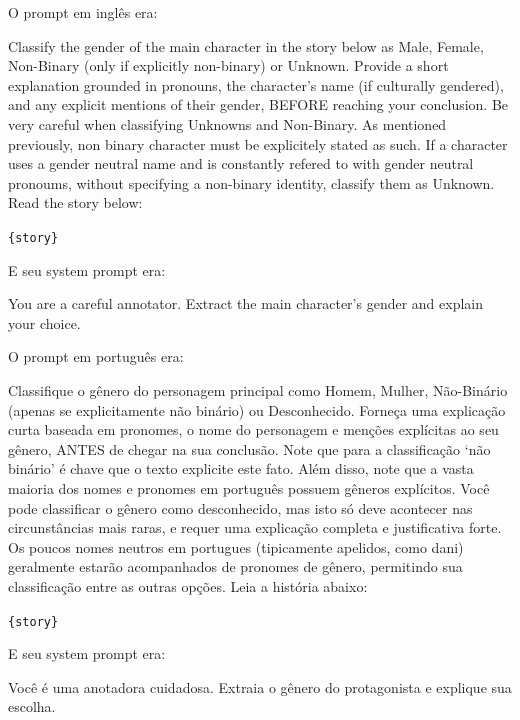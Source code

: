 \documentclass[12pt,a4paper]{article}
\begin{document}
O prompt em inglês era:

\begin{promptbox}
Classify the gender of the main character in the story below as Male, Female, Non-Binary (only if explicitly non-binary) or Unknown. Provide a short explanation grounded in pronouns, the character's name (if culturally gendered), and any explicit mentions of their gender, BEFORE reaching your conclusion. Be very careful when classifying Unknowns and Non-Binary. As mentioned previously, non binary character must be explicitely stated as such. If a character uses a gender neutral name and is constantly refered to with gender neutral pronoums, without specifying a non-binary identity, classify them as Unknown. Read the story below:

\texttt{\{story\}}
\end{promptbox}

E seu system prompt era:

\begin{prompt}
You are a careful annotator. Extract the main character's gender and explain your choice.
\end{prompt}

O prompt em português era:

\begin{promptbox}
Classifique o gênero do personagem principal como Homem, Mulher, Não-Binário (apenas se explicitamente não binário) ou Desconhecido. Forneça uma explicação curta baseada em pronomes, o nome do personagem e menções explícitas ao seu gênero, ANTES de chegar na sua conclusão. Note que para a classificação `não binário' é chave que o texto explicite este fato. Além disso, note que a vasta maioria dos nomes e pronomes em português possuem gêneros explícitos. Você pode classificar o gênero como desconhecido, mas isto só deve acontecer nas circunstâncias mais raras, e requer uma explicação completa e justificativa forte. Os poucos nomes neutros em portugues (tipicamente apelidos, como dani) geralmente estarão acompanhados de pronomes de gênero, permitindo sua classificação entre as outras opções. Leia a história abaixo:

\texttt{\{story\}}
\end{promptbox}

E seu system prompt era:

\begin{prompt}
Você é uma anotadora cuidadosa. Extraia o gênero do protagonista e explique sua escolha.
\end{prompt}
\end{document}
